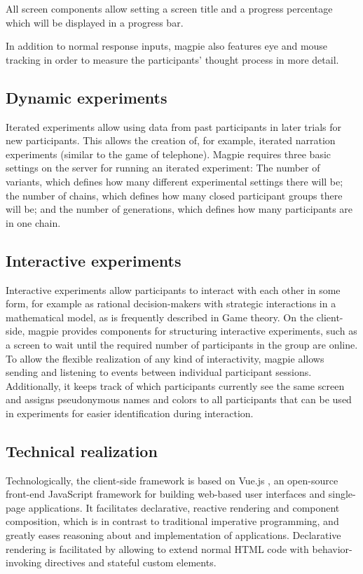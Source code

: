 \documentclass[a4paper,10pt]{paper}
\begin{document}
All screen components allow setting a screen title and a progress percentage which will be displayed in a progress bar.

In addition to normal response inputs, magpie also features eye and mouse tracking in order to measure the participants' thought process in more detail.

\subsection{Dynamic experiments}
Iterated experiments allow using data from past participants in later trials for new participants. This allows the creation of, for example, iterated narration experiments (similar to the game of telephone).
Magpie requires three basic settings on the server for running an iterated experiment: The number of variants, which defines how many different experimental settings there will be; the number of chains, which defines how many closed participant groups there will be; and the number of generations, which defines how many participants are in one chain.

\subsection{Interactive experiments}
Interactive experiments allow participants to interact with each other in some form, for example as rational decision-makers with strategic interactions in a mathematical model, as is frequently described in Game theory. On the client-side, magpie provides components for structuring interactive experiments, such as a screen to wait until the required number of participants in the group are online. To allow the flexible realization of any kind of interactivity, magpie allows sending and listening to events between individual participant sessions. Additionally, it keeps track of which participants currently see the same screen and assigns pseudonymous names and colors to all participants that can be used in experiments for easier identification during interaction.

\subsection{Technical realization}
Technologically, the client-side framework is based on Vue.js \citep{You2014}, an open-source front-end JavaScript framework for building web-based user interfaces and single-page applications. It facilitates declarative, reactive rendering and component composition, which is in contrast to traditional imperative programming, and greatly eases reasoning about and implementation of applications. Declarative rendering is facilitated by allowing to extend normal HTML code with behavior-invoking directives and stateful custom elements.
\end{document}
